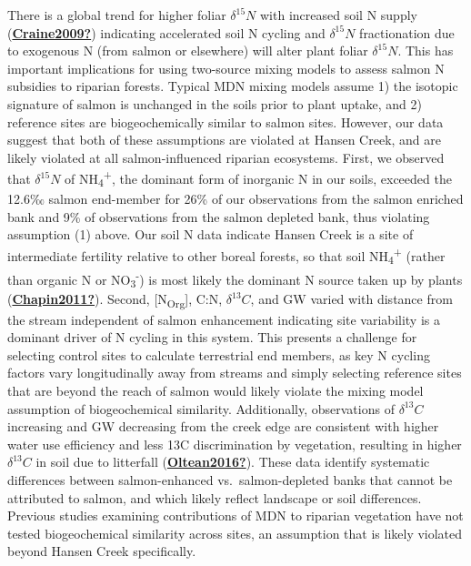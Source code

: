 \documentclass [11pt, proquest] {uwthesis}[2015/03/03]
\begin{document}
There is a global trend for higher foliar \(\delta^{15}N\) with increased soil N supply (\protect\hyperlink{ref-Craine2009}{\textbf{Craine2009?}}) indicating accelerated soil N cycling and \(\delta^{15}N\) fractionation due to exogenous N (from salmon or elsewhere) will alter plant foliar \(\delta^{15}N\). This has important implications for using two-source mixing models to assess salmon N subsidies to riparian forests. Typical MDN mixing models assume 1) the isotopic signature of salmon is unchanged in the soils prior to plant uptake, and 2) reference sites are biogeochemically similar to salmon sites. However, our data suggest that both of these assumptions are violated at Hansen Creek, and are likely violated at all salmon-influenced riparian ecosystems. First, we observed that \(\delta^{15}N\) of NH\textsubscript{4}\textsuperscript{+}, the dominant form of inorganic N in our soils, exceeded the 12.6‰ salmon end-member for 26\% of our observations from the salmon enriched bank and 9\% of observations from the salmon depleted bank, thus violating assumption (1) above. Our soil N data indicate Hansen Creek is a site of intermediate fertility relative to other boreal forests, so that soil NH\textsubscript{4}\textsuperscript{+} (rather than organic N or NO\textsubscript{3}\textsuperscript{-}) is most likely the dominant N source taken up by plants (\protect\hyperlink{ref-Chapin2011}{\textbf{Chapin2011?}}). Second, {[}N\textsubscript{Org}{]}, C:N, \(\delta^{13}C\), and GW varied with distance from the stream independent of salmon enhancement indicating site variability is a dominant driver of N cycling in this system. This presents a challenge for selecting control sites to calculate terrestrial end members, as key N cycling factors vary longitudinally away from streams and simply selecting reference sites that are beyond the reach of salmon would likely violate the mixing model assumption of biogeochemical similarity. Additionally, observations of \(\delta^{13}C\) increasing and GW decreasing from the creek edge are consistent with higher water use efficiency and less 13C discrimination by vegetation, resulting in higher \(\delta^{13}C\) in soil due to litterfall (\protect\hyperlink{ref-Oltean2016}{\textbf{Oltean2016?}}). These data identify systematic differences between salmon-enhanced vs.~salmon-depleted banks that cannot be attributed to salmon, and which likely reflect landscape or soil differences. Previous studies examining contributions of MDN to riparian vegetation have not tested biogeochemical similarity across sites, an assumption that is likely violated beyond Hansen Creek specifically.
\end{document}
